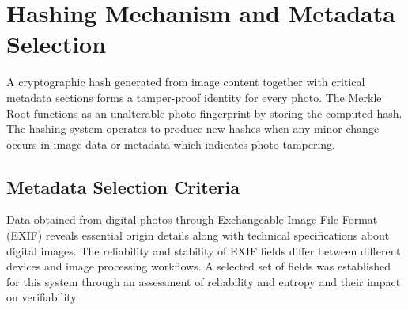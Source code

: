 \section{Hashing Mechanism and Metadata Selection}
A cryptographic hash generated from image content together with critical metadata sections forms a tamper-proof identity for every photo. The Merkle Root functions as an unalterable photo fingerprint by storing the computed hash. The hashing system operates to produce new hashes when any minor change occurs in image data or metadata which indicates photo tampering.

\subsection{Metadata Selection Criteria}
Data obtained from digital photos through Exchangeable Image File Format (EXIF) reveals essential origin details along with technical specifications about digital images. The reliability and stability of EXIF fields differ between different devices and image processing workflows. A selected set of fields was established for this system through an assessment of reliability and entropy and their impact on verifiability.

